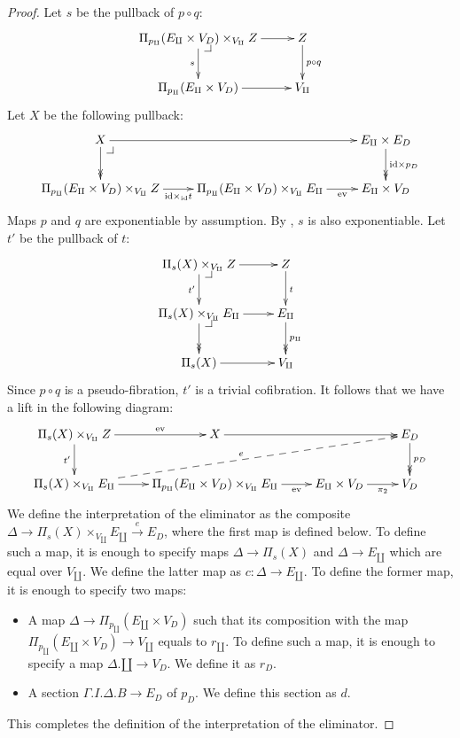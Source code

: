 \documentclass[reqno]{amsart}
\makeatletter
\theoremstyle{definition}
\theoremstyle{remark}
\newcommand{\fs}[1]{\mathrm{#1}}
\newcommand{\id}{\fs{id}}
\numberwithin{figure}{section}
\newcommand{\pb}[1][dr]{\save*!/#1-1.2pc/#1:(-1,1)@^{|-}\restore}
\makeatother
\begin{document}
\begin{proof}
Let $s$ be the pullback of $p \circ q$:
\[ \xymatrix{ \Pi_{p_\amalg}(E_\amalg \times V_D) \times_{V_\amalg} Z \ar[r] \ar[d]_s \pb   & Z \ar[d]^{p \circ q} \\
              \Pi_{p_\amalg}(E_\amalg \times V_D) \ar[r]                                    & V_\amalg
            } \]
Let $X$ be the following pullback:
\[ \xymatrix{ X \ar[rr] \ar@{->>}[d] \pb                                                            &                                                                                   & E_\amalg \times E_D \ar@{->>}[d]^{\id \times p_D} \\
              \Pi_{p_\amalg}(E_\amalg \times V_D) \times_{V_\amalg} Z \ar[r]_-{\id \times_\id t}    & \Pi_{p_\amalg}(E_\amalg \times V_D) \times_{V_\amalg} E_\amalg \ar[r]_-{\fs{ev}}  & E_\amalg \times V_D
            } \]
Maps $p$ and $q$ are exponentiable by assumption.
By \cite[Corollary~2.6]{comp-fact-tor}, $s$ is also exponentiable.
Let $t'$ be the pullback of $t$:
\[ \xymatrix{ \Pi_s(X) \times_{V_\amalg} Z \ar[r] \ar[d]_{t'} \pb           & Z \ar[d]^t                        \\
              \Pi_s(X) \times_{V_\amalg} E_\amalg \ar[r] \ar@{->>}[d] \pb   & E_\amalg \ar@{->>}[d]^{p_\amalg}  \\
              \Pi_s(X) \ar[r]                                               & V_\amalg
            } \]
Since $p \circ q$ is a pseudo-fibration, $t'$ is a trivial cofibration.
It follows that we have a lift in the following diagram:
\[ \xymatrix{ \Pi_s(X) \times_{V_\amalg} Z \ar[r]^-{\fs{ev}} \ar[d]_{t'}    & X \ar[rr]                                                                         &                                       & E_D \ar@{->>}[d]^{p_D} \\
              \Pi_s(X) \times_{V_\amalg} E_\amalg \ar[r] \ar@{-->}[urrr]^e  & \Pi_{p_\amalg}(E_\amalg \times V_D) \times_{V_\amalg} E_\amalg \ar[r]_-{\fs{ev}}  & E_\amalg \times V_D \ar[r]_-{\pi_2}   & V_D
            } \]
We define the interpretation of the eliminator as the composite $\Delta \to \Pi_s(X) \times_{V_\amalg} E_\amalg \xrightarrow{e} E_D$, where the first map is defined below.
To define such a map, it is enough to specify maps $\Delta \to \Pi_s(X)$ and $\Delta \to E_\amalg$ which are equal over $V_\amalg$.
We define the latter map as $c : \Delta \to E_\amalg$.
To define the former map, it is enough to specify two maps:
\begin{itemize}
\item A map $\Delta \to \Pi_{p_\amalg}(E_\amalg \times V_D)$ such that its composition with the map $\Pi_{p_\amalg}(E_\amalg \times V_D) \to V_\amalg$ equals to $r_\amalg$.
To define such a map, it is enough to specify a map $\Delta.\amalg \to V_D$.
We define it as $r_D$.
\item A section $\Gamma.I.\Delta.B \to E_D$ of $p_D$.
We define this section as $d$.
\end{itemize}
This completes the definition of the interpretation of the eliminator.
\end{proof}
\end{document}

